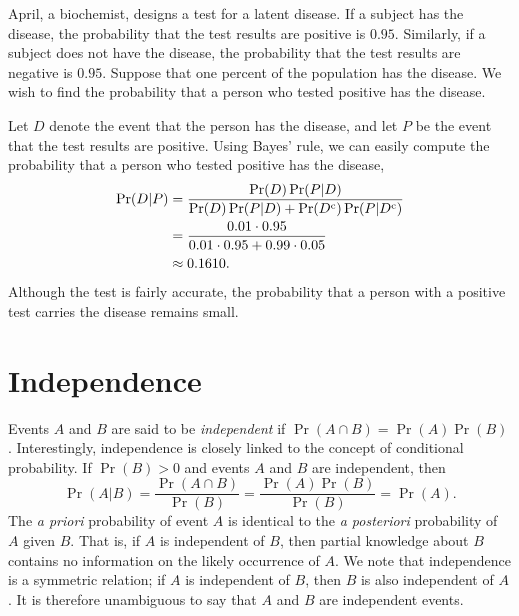 \begin{example}
April, a biochemist, designs a test for a latent disease.
If a subject has the disease, the probability that the test results are positive is $0.95$.
Similarly, if a subject does not have the disease, the probability that the test results are negative is $0.95$.
Suppose that one percent of the population has the disease.
We wish to find the probability that a person who tested positive has the disease.

Let $D$ denote the event that the person has the disease, and let $P$ be the event that the test results are positive.
Using Bayes' rule, we can easily compute the probability that a person who tested positive has the disease,
\begin{equation*}
\begin{split}
\Pr (D|P)
&= \frac{ \Pr(D) \Pr(P|D) }{ \Pr(D) \Pr(P|D) + \Pr(D^{\mathrm{c}}) \Pr(P|D^{\mathrm{c}}) } \\
&= \frac{ 0.01 \cdot 0.95 }{ 0.01 \cdot 0.95 + 0.99 \cdot 0.05 } \\
&\approx 0.1610 .
\end{split}
\end{equation*}
Although the test is fairly accurate, the probability that a person with a positive test carries the disease remains small.
\end{example}


\section{Independence}
\label{section:Independence}

Events $A$ and $B$ are said to be \emph{independent} if $\Pr (A \cap B) = \Pr(A) \Pr(B)$. 
Interestingly, independence is closely linked to the concept of conditional probability.
If $\Pr(B) > 0$ and events $A$ and $B$ are independent, then
\begin{equation*}
\Pr (A | B) = \frac{ \Pr (A \cap B) }{\Pr (B)}
= \frac{ \Pr (A) \Pr(B) }{\Pr (B)}
= \Pr (A).
\end{equation*}
The \emph{a priori} probability of event $A$ is identical to the \emph{a posteriori} probability of $A$ given $B$.
That is, if $A$ is independent of $B$, then partial knowledge about $B$ contains no information on the likely occurrence of $A$.
We note that independence is a symmetric relation; if $A$ is independent of $B$, then $B$ is also independent of $A$.
It is therefore unambiguous to say that $A$ and $B$ are independent events.

